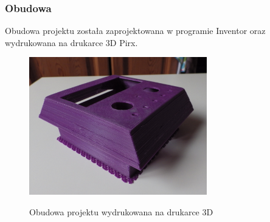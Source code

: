 \documentclass[12pt,a4paper]{article}
\begin{document}
\subsubsection{Obudowa}
Obudowa projektu została zaprojektowana w programie Inventor oraz wydrukowana na drukarce 3D Pirx.
	\begin{figure}[!h]
	\centering
		\includegraphics[height =60mm]{obudowa.jpg}
		\label{elktro}
		\caption{Obudowa projektu wydrukowana na drukarce 3D}
	\end{figure}
\end{document}
